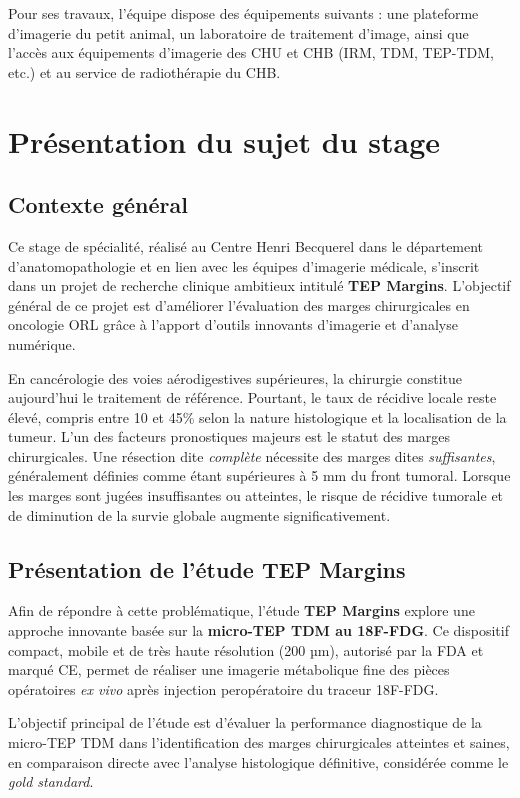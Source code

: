 \documentclass[12pt,a4paper]{report}
\begin{document}
Pour ses travaux, l'équipe dispose des équipements suivants : une plateforme d'imagerie du petit animal, un laboratoire de traitement d'image, ainsi que l'accès aux équipements d'imagerie des CHU et CHB (IRM, TDM, TEP-TDM, etc.) et au service de radiothérapie du CHB.

\chapter{Présentation du sujet du stage}

\section{Contexte général}

Ce stage de spécialité, réalisé au Centre Henri Becquerel dans le département d'anatomopathologie et en lien avec les équipes d'imagerie médicale, s'inscrit dans un projet de recherche clinique ambitieux intitulé \textbf{TEP Margins}. L'objectif général de ce projet est d'améliorer l'évaluation des marges chirurgicales en oncologie ORL grâce à l'apport d'outils innovants d'imagerie et d'analyse numérique.

En cancérologie des voies aérodigestives supérieures, la chirurgie constitue aujourd'hui le traitement de référence. Pourtant, le taux de récidive locale reste élevé, compris entre 10 et 45\% selon la nature histologique et la localisation de la tumeur. L'un des facteurs pronostiques majeurs est le statut des marges chirurgicales. Une résection dite \textit{complète} nécessite des marges dites \textit{suffisantes}, généralement définies comme étant supérieures à 5 mm du front tumoral. Lorsque les marges sont jugées insuffisantes ou atteintes, le risque de récidive tumorale et de diminution de la survie globale augmente significativement.

\section{Présentation de l'étude TEP Margins}

Afin de répondre à cette problématique, l'étude \textbf{TEP Margins} explore une approche innovante basée sur la \textbf{micro-TEP TDM au 18F-FDG}. Ce dispositif compact, mobile et de très haute résolution (200 µm), autorisé par la FDA et marqué CE, permet de réaliser une imagerie métabolique fine des pièces opératoires \textit{ex vivo} après injection peropératoire du traceur 18F-FDG.

L'objectif principal de l'étude est d'évaluer la performance diagnostique de la micro-TEP TDM dans l'identification des marges chirurgicales atteintes et saines, en comparaison directe avec l'analyse histologique définitive, considérée comme le \textit{gold standard}.
\end{document}
